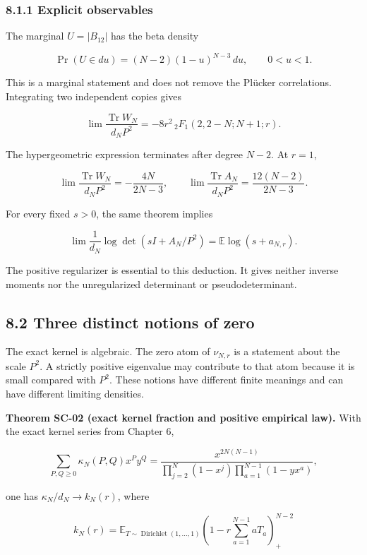 \hypertarget{explicit-observables}{%
\subsubsection{8.1.1 Explicit observables}\label{explicit-observables}}

The marginal \(U=|B_{12}|\) has the beta density

\[
\Pr(U\in du)=(N-2)(1-u)^{N-3}\,du,\qquad0<u<1.
\]

This is a marginal statement and does not remove the Plücker correlations. Integrating two independent copies gives

\[
\lim\frac{\operatorname{Tr}W_N}{d_NP^2}
=-8r^2\,{}_2F_1(2,2-N;N+1;r).
\]

The hypergeometric expression terminates after degree \(N-2\). At \(r=1\),

\[
\lim\frac{\operatorname{Tr}W_N}{d_NP^2}=-\frac{4N}{2N-3},\qquad
\lim\frac{\operatorname{Tr}A_N}{d_NP^2}=\frac{12(N-2)}{2N-3}.
\]

For every fixed \(s>0\), the same theorem implies

\[
\lim\frac1{d_N}\log\det(sI+A_N/P^2)
=\mathbb E\log(s+a_{N,r}).
\]

The positive regularizer is essential to this deduction. It gives neither inverse moments nor the unregularized determinant or pseudodeterminant.

\hypertarget{three-distinct-notions-of-zero}{%
\subsection{8.2 Three distinct notions of zero}\label{three-distinct-notions-of-zero}}

The exact kernel is algebraic. The zero atom of \(\nu_{N,r}\) is a statement about the scale \(P^2\). A strictly positive eigenvalue may contribute to that atom because it is small compared with \(P^2\). These notions have different finite meanings and can have different limiting densities.

\textbf{Theorem SC-02 (exact kernel fraction and positive empirical law).} With the exact kernel series from Chapter 6,

\[
\sum_{P,Q\geq0}\kappa_N(P,Q)x^Py^Q
=\frac{x^{2N(N-1)}}{
\prod_{j=2}^N(1-x^j)\prod_{a=1}^{N-1}(1-yx^a)},
\]

one has \(\kappa_N/d_N\to k_N(r)\), where

\[
k_N(r)=\mathbb E_{T\sim\operatorname{Dirichlet}(1,\ldots,1)}
\left(1-r\sum_{a=1}^{N-1}aT_a\right)_+^{N-2}
\]


